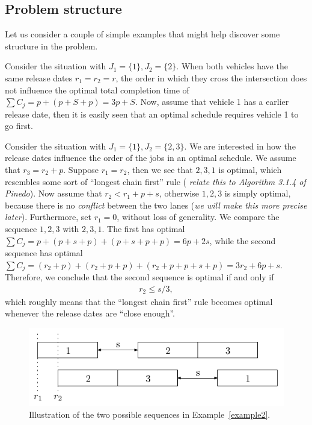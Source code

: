 \documentclass{article}
\theoremstyle{definition}
\theoremstyle{plain}
\begin{document}
\newpage

\subsection{Problem structure}
Let us consider a couple of simple examples that might help discover some structure in the problem.

\begin{eg}
  Consider the situation with $J_{1} = \{ 1 \}, J_{2} = \{ 2 \}$. When both
  vehicles have the same release dates $r_{1} = r_{2} = r$, the order in which
  they cross the intersection does not influence the optimal total completion
  time of $\sum C_{j} = p + (p + S + p) = 3p + S$. Now, assume that vehicle 1
  has a earlier release date, then it is easily seen that an optimal schedule
  requires vehicle 1 to go first.
\end{eg}
%
\begin{eg}
  \label{example2}
  Consider the situation with $J_{1} = \{ 1 \}, J_{2} = \{ 2, 3 \}$. We are
  interested in how the release dates influence the order of the jobs in an
  optimal schedule. We assume that $r_{3} = r_{2} + p$. Suppose $r_{1} = r_{2}$,
  then we see that $2, 3, 1$ is optimal, which resembles some sort of ``longest
  chain first'' rule (\textit{\color{blue} relate this to Algorithm 3.1.4 of
    Pinedo}). Now assume that $r_{2} < r_{1} + p + s$, otherwise $1, 2, 3$ is
  simply optimal, because there is no \textit{conflict} between the two lanes
  (\textit{\color{blue}we will make this more precise later}). Furthermore, set
  $r_{1} = 0$, without loss of generality. We compare the sequence $1, 2, 3$
  with $2, 3, 1$. The first has optimal
  $\sum C_{j} = p + (p+s+p) + (p+s+p+p) = 6p + 2s$, while the second sequence
  has optimal
  $\sum C_{j} = (r_{2} + p) + (r_{2} + p + p) + (r_{2} + p + p + s + p) = 3 r_{2} + 6p + s$.
  Therefore, we conclude that the second sequence is optimal if and only if
  \begin{align*}
    r_{2} \leq s/3 ,
  \end{align*}
  which roughly means that the ``longest chain first'' rule becomes optimal
  whenever the release dates are ``close enough''.
\end{eg}
%
\begin{figure}
  \centering
  \includegraphics{figures/123.pdf}
  \caption{Illustration of the two possible sequences in Example~\ref{example2}.}
  \label{fig:example2}
\end{figure}
\end{document}
